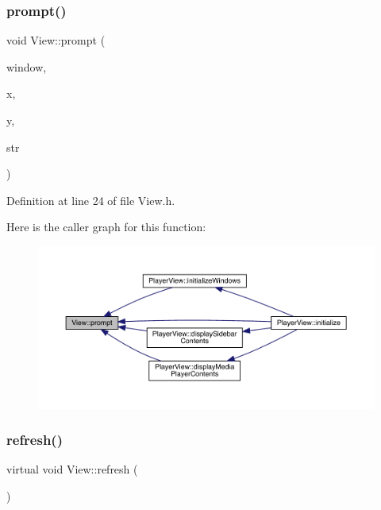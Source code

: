 \subsubsection{\texorpdfstring{prompt()}{prompt()}}
{\footnotesize\ttfamily void View\+::prompt (\begin{DoxyParamCaption}\item[{W\+I\+N\+D\+OW $\ast$}]{window,  }\item[{unsigned int}]{x,  }\item[{unsigned int}]{y,  }\item[{const char $\ast$}]{str }\end{DoxyParamCaption})\hspace{0.3cm}{\ttfamily [inline]}}



Definition at line 24 of file View.\+h.

Here is the caller graph for this function\+:
\nopagebreak
\begin{figure}[H]
\begin{center}
\leavevmode
\includegraphics[width=350pt]{class_view_a48b5a945ec29e4a9a4c98e6da58b9a45_icgraph}
\end{center}
\end{figure}
\mbox{\label{class_view_a6d911cc903b676dbae7c91daa5277803}} 
\subsubsection{\texorpdfstring{refresh()}{refresh()}}
{\footnotesize\ttfamily virtual void View\+::refresh (\begin{DoxyParamCaption}{ }\end{DoxyParamCaption})\hspace{0.3cm}{\ttfamily [pure virtual]}}



